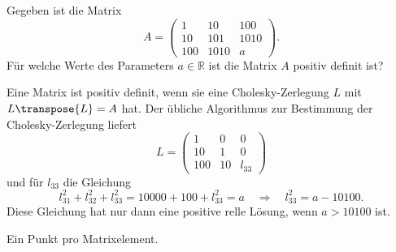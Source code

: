 Gegeben ist die Matrix
\[
A=\begin{pmatrix}
  1&   10&  100\\
 10&  101& 1010\\
100& 1010&  a
\end{pmatrix}.
\]
Für welche Werte des Parameters $a\in\mathbb R$ ist die Matrix
$A$ positiv definit ist?


\begin{loesung}
Eine Matrix ist positiv definit, wenn sie eine Cholesky-Zerlegung $L$ mit
$L\transpose{L}=A$ hat.
Der übliche Algorithmus zur Bestimmung der Cholesky-Zerlegung liefert
\[
L=\begin{pmatrix}
1&0&0\\
10&1&0\\
100&10&l_{33}
\end{pmatrix}
\]
und für $l_{33}$ die Gleichung
\[
l_{31}^2 + l_{32}^2 + l_{33}^2 = 10000 + 100 + l_{33}^2 = a
\quad\Rightarrow\quad
l_{33}^2 = a - 10100.
\]
Diese Gleichung hat nur dann eine positive relle Lösung, wenn $a > 10100$ ist.
\end{loesung}

\begin{bewertung}
Ein Punkt pro Matrixelement.
\end{bewertung}

